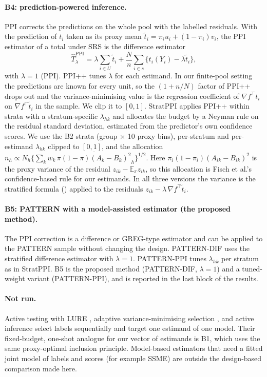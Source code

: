 \paragraph{B4: prediction-powered inference.} PPI \citep{angelopoulos2023ppi} corrects the predictions on the whole pool with the labelled residuals. With the prediction of $t_i$ taken as its proxy mean $\tilde t_i=\pi_iu_i+(1-\pi_i)v_i$, the PPI estimator of a total under SRS is the difference estimator
\[
\hat T^{\mathrm{PPI}}_\lambda=\lambda\sum_{i\in U}\tilde t_i+\frac Nn\sum_{i\in s}\{t_i(Y_i)-\lambda\tilde t_i\},
\]
with $\lambda=1$ (PPI). PPI++ \citep{angelopoulos2026ppipp} tunes $\lambda$ for each estimand. In our finite-pool setting the predictions are known for every unit, so the $(1+n/N)$ factor of PPI++ drops out and the variance-minimising value is the regression coefficient of $\nabla f^\top t_i$ on $\nabla f^\top\tilde t_i$ in the sample. We clip it to $[0,1]$. StratPPI \citep{fisch2024stratppi} applies PPI++ within strata with a stratum-specific $\lambda_{hk}$ and allocates the budget by a Neyman rule on the residual standard deviation, estimated from the predictor's own confidence scores. We use the B2 strata (group $\times$ 10 proxy bins), per-stratum and per-estimand $\lambda_{hk}$ clipped to $[0,1]$, and the allocation $n_h\propto N_h\{\sum_k w_k\,\overline{\pi(1-\pi)(A_{k}-B_{k})^2}_h\}^{1/2}$. Here $\pi_i(1-\pi_i)(A_{ik}-B_{ik})^2$ is the proxy variance of the residual $z_{ik}-\mathbb E_\pi z_{ik}$, so this allocation is Fisch et al.'s confidence-based rule for our estimands. In all three versions the variance is the stratified formula () applied to the residuals $z_{ik}-\lambda\,\nabla f^\top\tilde t_i$.

\paragraph{B5: PATTERN with a model-assisted estimator (the proposed method).} The PPI correction is a difference or GREG-type estimator \citep[Chapter~6]{sarndal1992} and can be applied to the PATTERN sample without changing the design. PATTERN-DIF uses the stratified difference estimator with $\lambda=1$. PATTERN-PPI tunes $\lambda_{hk}$ per stratum as in StratPPI. B5 is the proposed method (PATTERN-DIF, $\lambda=1$) and a tuned-weight variant (PATTERN-PPI), and is reported in the last block of the results.

\paragraph{Not run.} Active testing with LURE \citep{kossen2021active}, adaptive variance-minimising selection \citep{hara2024}, and active inference \citep{zrnic2024active,li2025robust} select labels sequentially and target one estimand of one model. Their fixed-budget, one-shot analogue for our vector of estimands is B1, which uses the same proxy-optimal inclusion principle. Model-based estimators that need a fitted joint model of labels and scores (for example SSME) are outside the design-based comparison made here.

